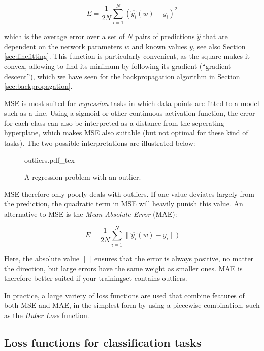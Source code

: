 \begin{equation}
E=\frac{1}{2N}\sum_{i=1}^{N}(\hat{y_i}(w)-y_i)^2
\end{equation}

which is the average error over a set of $N$ pairs of predictions $\hat{y}$ that are dependent on the network parameters $w$ and known values $y$, see also Section \ref{sec:linefitting}. This function is particularly convenient, as the square makes it convex, allowing to find its minimum by following its gradient (``gradient descent''), which we have seen for the backpropagation algorithm in Section \ref{sec:backpropagation}.

MSE is most suited for \emph{regression} tasks in which data points are fitted to a model such as a line. Using a sigmoid or other continuous activation function, the error for each class can also be interpreted as a distance from the seperating hyperplane, which makes MSE also suitable (but not optimal for these kind of tasks). The two possible interpretations are illustrated below:

\begin{figure}[htb]
    \centering
    \def\svgwidth{0.5\textwidth}
    {outliers.pdf_tex}
    \caption{A regression problem with an outlier.\label{fig:outliers}}
\end{figure}

MSE therefore only poorly deals with outliers. If one value deviates largely from the prediction, the quadratic term in MSE will heavily punish this value. An alternative to MSE is the \emph{Mean Absolute Error} (MAE):

\begin{equation}
E=\frac{1}{2N}\sum_{i=1}^N\|\hat{y_i}(w)-y_i\|)
\end{equation}

Here, the absolute value $\|\dot\|$ ensures that the error is always positive, no matter the direction, but large errors have the same weight as smaller ones. MAE is therefore better suited if your trainingset contains outliers.

In practice, a large variety of loss functions are used that combine features of both MSE and MAE, in the simplest form by using a piecewise combination, such as the \emph{Huber Loss} function. 


\subsection{Loss functions for classification tasks}

